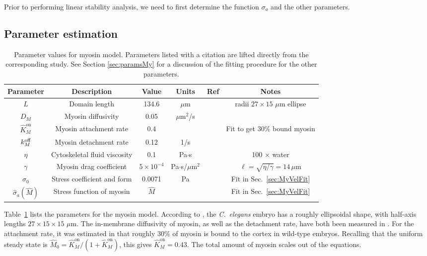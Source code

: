 \documentclass[11pt]{article}
\newcommand{\6}[1]{#1_{\text{6}}}
\newcommand{\3}[1]{#1_{\text{3}}}
\newcommand{\My}[1]{#1_M}
\begin{document}
Prior to performing linear stability analysis, we need to first determine the function $\sigma_a$ and the other parameters. 

\subsection{Parameter estimation \label{sec:paramsMy}}

\begin{table}
\begin{small}
\centering
\begin{tabular}{|c|c|c|c|c|c|}\hline
Parameter & Description & Value & Units & Ref & Notes \\ \hline
$L$ & Domain length & 134.6 & $\mu$m &  \cite{goehring2011polarization} & radii $27 \times 15$ $\mu$m ellipse\\
$\My{D}$ & Myosin diffusivity & 0.05 & $\mu$m$^2$/s & \cite{gross2019guiding} &\\
$\hat{K}^\text{on}_M$ & Myosin attachment rate & 0.4 & & & Fit to get 30\% bound myosin\\
$\My{\koff} $ & Myosin detachment rate & 0.12 & 1/s & \cite{gross2019guiding}& \\
$\eta$ & Cytoskeletal fluid viscosity & 0.1 & Pa$\cdot$s & &100 $\times$ water \\
$\gamma$ & Myosin drag coefficient & $5 \times 10^{-4}$ & Pa$\cdot$s/$\mu$m$^2$ &  & $\ell=\sqrt{\eta/\gamma}=14 \, \mu$m \cite{mayer2010anisotropies}\\ 
$\sigma_0$ & Stress coefficient and form& 0.0071 & Pa & & Fit in Sec.\ \ref{sec:MyVelFit}\\
$\hat \sigma_a(\hat M)$ & Stress function of myosin& $\hat M$ & & & Fit in Sec.\ \ref{sec:MyVelFit}\\ \hline
\end{tabular}
\caption{\label{tab:paramsMy} Parameter values for myosin model. Parameters listed with a citation are lifted directly from the corresponding study. See Section \ref{sec:paramsMy} for a discussion of the fitting procedure for the other parameters. }
\end{small}
\end{table}

Table\ \ref{tab:paramsMy} lists the parameters for the myosin model. According to \cite{goehring2011polarization}, the \emph{C.\ elegans} embryo has a roughly ellipsoidal shape, with half-axis lengths $27 \times 15 \times 15$ $\mu$m.  The in-membrane diffusivity of myosin, as well as the detachment rate, have both been measured in \cite{gross2019guiding}. For the attachment rate, it was estimated in \cite[Fig.~S3m]{gross2019guiding} that roughly 30\% of myosin is bound to the cortex in wild-type embryos. Recalling that the uniform steady state is $\hat M_0=\hat{K}^\text{on}_M/\left(1+\hat{K}^\text{on}_M\right)$, this gives $\hat{K}^\text{on}_M=0.43$. The total amount of myosin scales out of the equations.
\end{document}
